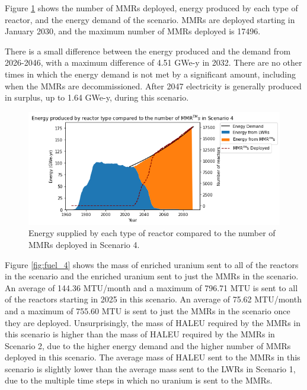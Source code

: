 Figure \ref{fig:energy_rx_4} shows the number of \glspl{MMR} deployed, 
energy produced by each type of reactor, and the energy demand of the 
scenario. \glspl{MMR} are deployed starting in January 2030, and the maximum 
number of \glspl{MMR} deployed is 17496. 

There is a small difference between the energy produced and the 
demand from 2026-2046, with a maximum difference of 4.51 GWe-y in 2032.
There are no other times in which the energy demand is not met by a 
significant amount, including when the \glspl{MMR} are decommissioned. 
After 2047 electricity is generally produced in surplus, up to 1.64 GWe-y, during 
this scenario. 

\begin{figure}
    \centering 
    \includegraphics[scale=0.5]{figures/energy_scenario4.png}
    \caption{Energy supplied by each type of reactor compared to the number of 
    \glspl{MMR} deployed in Scenario 4.}
    \label{fig:energy_rx_4}
\end{figure}

Figure \ref{fig:fuel_4} shows the mass of enriched uranium sent to all of the 
reactors in the scenario and the enriched uranium sent to just the \glspl{MMR} 
in the scenario. An average of 144.36 MTU/month and a maximum of 796.71 MTU
is sent to all of the reactors starting in 2025 in this scenario. An average of 
75.62 MTU/month and a maximum of 755.60 MTU is sent to just the \glspl{MMR}
in the scenario once they are deployed. Unsurprisingly, the mass of \gls{HALEU}
required by the \glspl{MMR} in this scenario is higher than the mass of 
\gls{HALEU} required by the \glspl{MMR} in Scenario 2, due to the higher energy 
demand and the higher number of \glspl{MMR} deployed in this scenario. The 
average mass of \gls{HALEU} sent to the \glspl{MMR} in this scenario is 
slightly lower than the average mass sent to the \glspl{LWR} in Scenario 1, 
due to the multiple time steps in which no uranium is sent to the \glspl{MMR}.

